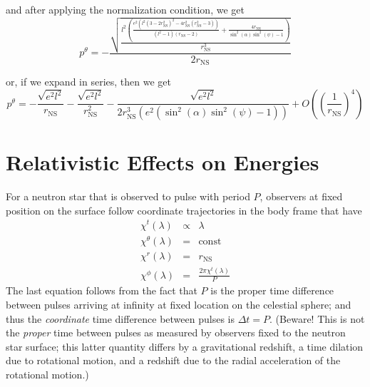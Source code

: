 \documentclass[modern]{aastex631}
\newcommand{\rNS}{r_\mathrm{NS}}
\begin{document}
and after applying the normalization condition, we get
\begin{equation}
    p^{\theta} = -\frac{\sqrt{\frac{l^2\left(\frac{e^2\left(l^2\left(3-2\rNS^2\right)^2-4\rNS^2\left(\rNS^2-3\right)\right)}{\left(l^2-1\right)(\rNS-2)}+\frac{4\rNS}{\sin^2(\alpha)\sin^2(\psi)-1}\right)}{\rNS^3}}}{2\rNS}
\end{equation}

or, if we expand in series, then we get
\begin{equation}
    p^{\theta}=-\frac{\sqrt{e^2l^2}}{\rNS}-\frac{\sqrt{e^2l^2}}{\rNS^2}-\frac{\sqrt{e^2l^2}}{2\rNS^3\left(e^2\left(\sin^2(\alpha)\sin^2(\psi)-1\right)\right)}+O\left(\left(\frac{1}{\rNS}\right)^4\right)
\end{equation}

\section{Relativistic Effects on Energies}
\label{sec:relativistic}

For a neutron star that is observed to pulse with period $P$, observers at fixed
position on the surface follow coordinate trajectories in the body frame that
have 
\begin{eqnarray}
    \chi^t\left( \lambda \right) & \propto & \lambda \\
    \chi^\theta\left( \lambda \right) & = & \mathrm{const} \\
    \chi^r\left( \lambda \right) & = & \rNS \\
    \chi^\phi\left(\lambda \right) & = & \frac{2 \pi \chi^t\left(\lambda \right)}{P}
\end{eqnarray}
The last equation follows from the fact that $P$ is the proper time difference
between pulses arriving at infinity at fixed location on the celestial sphere;
and thus the \emph{coordinate} time difference between pulses is $\Delta t = P$.
(Beware!  This is not the \emph{proper} time between pulses as measured by
observers fixed to the neutron star surface; this latter quantity differs by a
gravitational redshift, a time dilation due to rotational motion, and a redshift
due to the radial acceleration of the rotational motion.)
\end{document}
